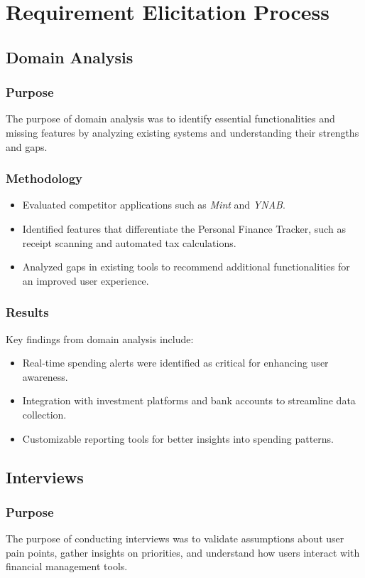 \section{Requirement Elicitation Process}

\subsection{Domain Analysis}
\subsubsection{Purpose}
The purpose of domain analysis was to identify essential functionalities and missing features by analyzing existing systems and understanding their strengths and gaps.

\subsubsection{Methodology}
\begin{itemize}
    \item Evaluated competitor applications such as \textit{Mint} and \textit{YNAB}.
    \item Identified features that differentiate the Personal Finance Tracker, such as receipt scanning and automated tax calculations.
    \item Analyzed gaps in existing tools to recommend additional functionalities for an improved user experience.
\end{itemize}

\subsubsection{Results}
Key findings from domain analysis include:
\begin{itemize}
    \item Real-time spending alerts were identified as critical for enhancing user awareness.
    \item Integration with investment platforms and bank accounts to streamline data collection.
    \item Customizable reporting tools for better insights into spending patterns.
\end{itemize}

\subsection{Interviews}
\subsubsection{Purpose}
The purpose of conducting interviews was to validate assumptions about user pain points, gather insights on priorities, and understand how users interact with financial management tools.

